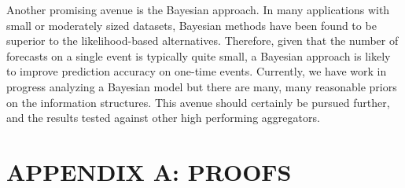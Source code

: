 \documentclass[12pt]{article}
\theoremstyle{definition}
\theoremstyle{definition}
\begin{document}
Another promising avenue is the Bayesian approach. In many applications with small or moderately sized datasets, Bayesian methods have been found to be superior to the likelihood-based alternatives. Therefore, given that the number of forecasts on a single event is typically quite small, a Bayesian approach is likely to improve prediction accuracy on one-time events. Currently, we have
work in progress analyzing a Bayesian model but there are many, many
reasonable priors on the information structures. 
 This avenue should
certainly be pursued further, and the results tested against other high
performing aggregators.




\appendix
\section*{APPENDIX A: PROOFS}
\label{appendixA}

\renewcommand{\thesubsection}{A.\arabic{subsection}}
\end{document}
